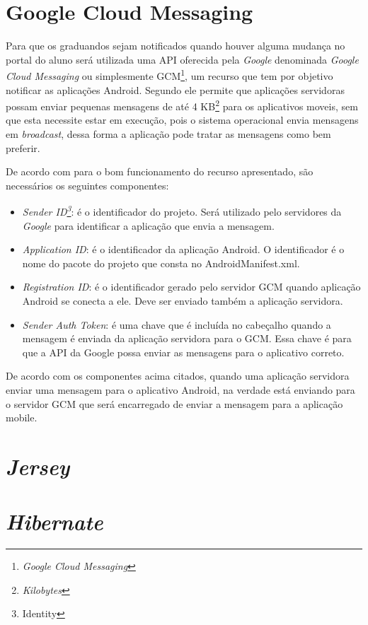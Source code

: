 \section{\textbf{Google Cloud 	Messaging}}

	\par Para que os graduandos sejam notificados quando houver alguma mudança no
portal do aluno será utilizada uma API oferecida pela \textit{Google}
denominada \textit{Google Cloud Messaging} ou simplesmente
GCM\footnote{\textit{Google Cloud Messaging}}, um recurso que tem por objetivo
notificar as aplicações Android. Segundo  ele permite que
aplicações servidoras possam enviar pequenas mensagens de até 4
KB\footnote{\textit{Kilobytes}} para os aplicativos moveis, sem que esta
necessite estar em execução, pois o sistema operacional envia mensagens em
\textit{broadcast}, dessa forma a aplicação pode tratar as mensagens como bem
preferir.
	\par De acordo com  para o bom funcionamento do recurso
apresentado, são necessários os seguintes componentes:

\begin{itemize}
	
	\item \textit{Sender ID\footnote{Identity}}: é o identificador do projeto.
	Será utilizado pelo servidores da \textit{Google} para identificar a aplicação
	que envia a mensagem.
	
	\item \textit{Application ID}: é o identificador da aplicação Android. O
	identificador é o nome do pacote do projeto que consta no AndroidManifest.xml.
	
	\item \textit{Registration ID}: é o identificador gerado pelo servidor GCM
	quando aplicação Android se conecta a ele. Deve ser enviado também a aplicação
	servidora.
	
	\item \textit{Sender Auth Token}: é uma chave que é incluída no cabeçalho
	quando a mensagem é enviada da aplicação servidora para o GCM. Essa chave é
	para que a API da Google possa enviar as mensagens para o aplicativo correto.

\end{itemize}

	\par De acordo com os componentes acima citados, quando uma aplicação servidora
enviar uma mensagem para o aplicativo Android, na verdade está enviando para o
servidor GCM que será encarregado de enviar a mensagem para a aplicação mobile.
\section{\textit{Jersey}}
\section{\textit{Hibernate}}